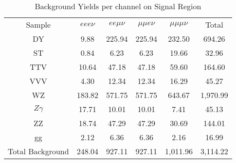 \begin{table}
  \caption{Background Yields per
    channel on Signal Region}
 \begin{center}
 \begin{tabular}{cccccc}\hline\hline
Sample & $eee\nu$ & $ee\mu\nu$ & $\mu\mu e\nu$ & $\mu\mu\mu\nu$ & Total \\
DY & 9.88 & 225.94 & 225.94 & 232.50 & 694.26 \\
ST & 0.84 & 6.23 & 6.23 & 19.66 & 32.96 \\
TTV & 10.64 & 47.18 & 47.18 & 59.60 & 164.60 \\
VVV & 4.30 & 12.34 & 12.34 & 16.29 & 45.27 \\
WZ & 183.82 & 571.75 & 571.75 & 643.67 & 1,970.99 \\
$Z\gamma$ & 17.71 & 10.01 & 10.01 & 7.41 & 45.13 \\
ZZ & 18.74 & 47.29 & 47.29 & 30.69 & 144.01 \\
gg & 2.12 & 6.36 & 6.36 & 2.16 & 16.99 \\ \hline
Total Background & 248.04 & 927.11 & 927.11 & 1,011.96 & 3,114.22 \\ \hline
 \end{tabular}
 \end{center}
 \label{tab:BackgroundYieldsSR}
\end{table}
